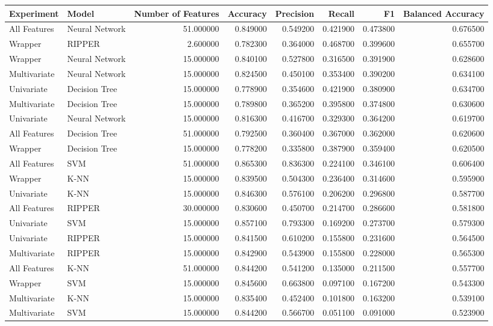 \begin{tabular}{llrrrrrr}
\toprule
Experiment & Model & Number of Features & Accuracy & Precision & Recall & F1 & Balanced Accuracy \\
\midrule
All Features & Neural Network & 51.000000 & 0.849000 & 0.549200 & 0.421900 & 0.473800 & 0.676500 \\
Wrapper & RIPPER & 2.600000 & 0.782300 & 0.364000 & 0.468700 & 0.399600 & 0.655700 \\
Wrapper & Neural Network & 15.000000 & 0.840100 & 0.527800 & 0.316500 & 0.391900 & 0.628600 \\
Multivariate & Neural Network & 15.000000 & 0.824500 & 0.450100 & 0.353400 & 0.390200 & 0.634100 \\
Univariate & Decision Tree & 15.000000 & 0.778900 & 0.354600 & 0.421900 & 0.380900 & 0.634700 \\
Multivariate & Decision Tree & 15.000000 & 0.789800 & 0.365200 & 0.395800 & 0.374800 & 0.630600 \\
Univariate & Neural Network & 15.000000 & 0.816300 & 0.416700 & 0.329300 & 0.364200 & 0.619700 \\
All Features & Decision Tree & 51.000000 & 0.792500 & 0.360400 & 0.367000 & 0.362000 & 0.620600 \\
Wrapper & Decision Tree & 15.000000 & 0.778200 & 0.335800 & 0.387900 & 0.359400 & 0.620500 \\
All Features & SVM & 51.000000 & 0.865300 & 0.836300 & 0.224100 & 0.346100 & 0.606400 \\
Wrapper & K-NN & 15.000000 & 0.839500 & 0.504300 & 0.236400 & 0.314600 & 0.595900 \\
Univariate & K-NN & 15.000000 & 0.846300 & 0.576100 & 0.206200 & 0.296800 & 0.587700 \\
All Features & RIPPER & 30.000000 & 0.830600 & 0.450700 & 0.214700 & 0.286600 & 0.581800 \\
Univariate & SVM & 15.000000 & 0.857100 & 0.793300 & 0.169200 & 0.273700 & 0.579300 \\
Univariate & RIPPER & 15.000000 & 0.841500 & 0.610200 & 0.155800 & 0.231600 & 0.564500 \\
Multivariate & RIPPER & 15.000000 & 0.842900 & 0.543900 & 0.155800 & 0.228000 & 0.565300 \\
All Features & K-NN & 51.000000 & 0.844200 & 0.541200 & 0.135000 & 0.211500 & 0.557700 \\
Wrapper & SVM & 15.000000 & 0.845600 & 0.663800 & 0.097100 & 0.167200 & 0.543300 \\
Multivariate & K-NN & 15.000000 & 0.835400 & 0.452400 & 0.101800 & 0.163200 & 0.539100 \\
Multivariate & SVM & 15.000000 & 0.844200 & 0.566700 & 0.051100 & 0.091000 & 0.523900 \\
\bottomrule
\end{tabular}
